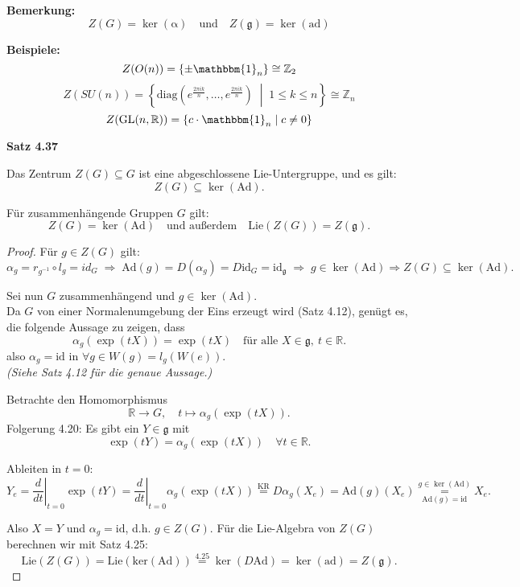 \documentclass[fleqn, 12pt, letterpaper]{article}
\newcommand{\txt}[1]{\text{#1}}
\begin{document}
\textbf{Bemerkung:}
\[
Z(G) = \ker(\mathrm{\alpha}) \quad \text{und} \quad Z(\mathfrak{g}) = \ker(\mathrm{ad})
\]

\textbf{Beispiele:}
\[
Z(O(n)) = \{ \pm \mathbbm{1}_n \} \cong \mathbb{Z}_2
\]
\[
Z(SU(n)) = \left\{ \mathrm{diag} \left( e^{\frac{2\pi i k}{n}}, \dots, e^{\frac{2\pi i k}{n}} \right) \;\middle|\; 1 \leq k \leq n \right\} \cong \mathbb{Z}_n
\]
\[
Z(\mathrm{GL}(n, \mathbb{R})) = \{ c \cdot \mathbbm{1}_n \mid c \neq 0 \}
\]

\textbf{Satz 4.37}

Das Zentrum \( Z(G) \subseteq G \) ist eine abgeschlossene Lie-Untergruppe, und es gilt:
\[
Z(G) \subseteq \ker(\mathrm{Ad}).
\]

Für zusammenhängende Gruppen \( G \) gilt: 
\[
Z(G) = \ker(\mathrm{Ad}) \quad \text{und außerdem} \quad \mathrm{Lie}(Z(G)) = Z(\mathfrak{g}).
\]

\begin{proof}
Für \( g \in Z(G) \) gilt:
\[
\alpha_g = r_{g^{-1}} \circ l_g=id_G \; \Rightarrow \; \mathrm{Ad}(g) = D(\alpha_g) = D\mathrm{id}_G=\mathrm{id}_\mathfrak{g}
\; \Rightarrow \; g \in \ker(\mathrm{Ad}) \Rightarrow Z(G) \subseteq \ker(\mathrm{Ad}).
\]

Sei nun \( G \) zusammenhängend und \( g \in \ker(\mathrm{Ad}) \).\\
Da \( G \) von einer Normalenumgebung der Eins erzeugt wird (Satz 4.12), genügt es, die folgende Aussage zu zeigen, dass
\[
\alpha_g(\exp(tX)) = \exp(tX) \quad \text{für alle } X \in \mathfrak{g},\ t \in \mathbb{R}.
\]
also $\alpha_g=\mathrm{id}$ in $\forall g\in W(g)=l_g(W(e))$.\\
\emph{(Siehe Satz 4.12 für die genaue Aussage.)}

Betrachte den Homomorphismus
\[
\mathbb{R} \to G, \quad t \mapsto \alpha_g(\exp(tX)).
\]
Folgerung 4.20:
Es gibt ein \( Y \in \mathfrak{g} \) mit
\[
\exp(tY) = \alpha_g(\exp(tX)) \quad \forall t \in \mathbb{R}.
\]

Ableiten in \( t = 0 \):
\[
Y_e = \left. \frac{d}{dt} \right|_{t=0} \exp(tY) = \left. \frac{d}{dt} \right|_{t=0} \alpha_g(\exp(tX)) \overset{\txt{KR}}{=} D \alpha_g (X_e) = \mathrm{Ad}(g)(X_e) \underset{\mathrm{Ad}(g) = \mathrm{id}}{\overset{g \in \ker(\mathrm{Ad})}{=}} X_e.
\]

Also \( X = Y \) und \( \alpha_g = \mathrm{id} \), d.h. \( g \in Z(G) \).
Für die Lie-Algebra von \( Z(G) \) berechnen wir mit Satz 4.25:
\[
\mathrm{Lie}(Z(G)) =\mathrm{Lie}(\mathrm{ker}(\mathrm{Ad}))\overset{4.25}{=}\ker(D\mathrm{Ad})=\ker(\mathrm{ad})=Z(\mathfrak{g}).
\]
\end{proof}
\end{document}
